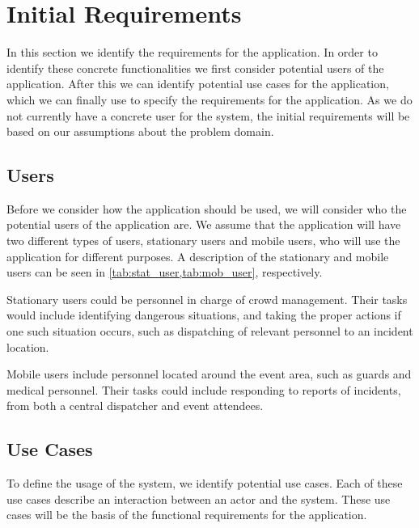 \section{Initial Requirements}\label{sec:s1_requirements}
In this section we identify the requirements for the application. In order to identify these concrete functionalities we first consider potential users of the application. After this we can identify potential use cases for the application, which we can finally use to specify the requirements for the application. As we do not currently have a concrete user for the system, the initial requirements will be based on our assumptions about the problem domain. 

\subsection{Users} \label{ss:s1_users}
Before we consider how the application should be used, we will consider who the potential users of the application are. We assume that the application will have two different types of users, stationary users and mobile users, who will use the application for different purposes. A description of the stationary and mobile users can be seen in \cref{tab:stat_user,tab:mob_user}, respectively.

Stationary users could be personnel in charge of crowd management. Their tasks would include identifying dangerous situations, and taking the proper actions if one such situation occurs, such as dispatching of relevant personnel to an incident location.



Mobile users include personnel located around the event area, such as guards and medical personnel. Their tasks could include responding to reports of incidents, from both a central dispatcher and event attendees.



\subsection{Use Cases} \label{ss:s1_uc}
To define the usage of the system, we identify potential use cases. Each of these use cases describe an interaction between an actor and the system. These use cases will be the basis of the functional requirements for the application.

